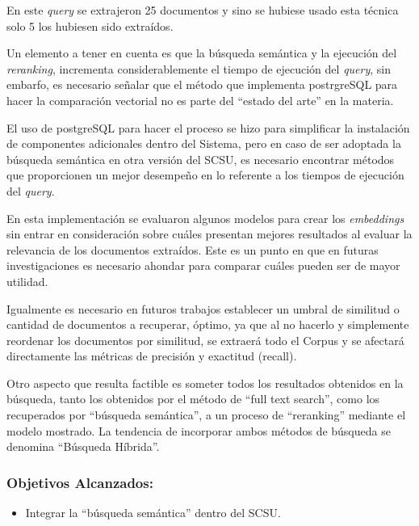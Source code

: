 \documentclass[
  12pt,
  openany]{book}
\providecommand{\tightlist}{%
  \setlength{\itemsep}{0pt}\setlength{\parskip}{0pt}}
\begin{document}
En este \emph{query} se extrajeron 25 documentos y sino se hubiese usado esta técnica solo 5 los hubiesen sido extraídos.

Un elemento a tener en cuenta es que la búsqueda semántica y la ejecución del \emph{reranking}, incrementa considerablemente el tiempo de ejecución del \emph{query}, sin embarfo, es necesario señalar que el método que implementa postrgreSQL para hacer la comparación vectorial no es parte del ``estado del arte'' en la materia.

El uso de postgreSQL para hacer el proceso se hizo para simplificar la instalación de componentes adicionales dentro del Sistema, pero en caso de ser adoptada la búsqueda semántica en otra versión del SCSU, es necesario encontrar métodos que proporcionen un mejor desempeño en lo referente a los tiempos de ejecución del \emph{query}.

En esta implementación se evaluaron algunos modelos para crear los \emph{embeddings} sin entrar en consideración sobre cuáles presentan mejores resultados al evaluar la relevancia de los documentos extraídos. Este es un punto en que en futuras investigaciones es necesario ahondar para comparar cuáles pueden ser de mayor utilidad.

Igualmente es necesario en futuros trabajos establecer un umbral de similitud o cantidad de documentos a recuperar, óptimo, ya que al no hacerlo y simplemente reordenar los documentos por similitud, se extraerá todo el Corpus y se afectará directamente las métricas de precisión y exactitud (recall).

Otro aspecto que resulta factible es someter todos los resultados obtenidos en la búsqueda, tanto los obtenidos por el método de ``full text search'', como los recuperados por ``búsqueda semántica'', a un proceso de ``reranking'' mediante el modelo mostrado. La tendencia de incorporar ambos métodos de búsqueda se denomina ``Búsqueda Híbrida''.

\hypertarget{objetivos-alcanzados-4}{%
\subsubsection{Objetivos Alcanzados:}\label{objetivos-alcanzados-4}}

\begin{itemize}
\tightlist
\item
  Integrar la ``búsqueda semántica'' dentro del SCSU.
\end{itemize}

\newpage
\end{document}
